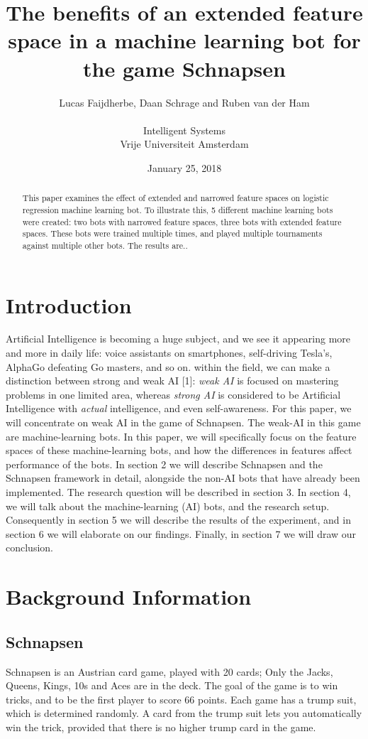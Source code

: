 \documentclass[a4paper,11pt]{article}
\title{The benefits of an extended feature space in a machine learning bot for the game Schnapsen}
\date{January 25, 2018}
\author{Lucas Faijdherbe, Daan Schrage and Ruben van der Ham\\\\
	\small Intelligent Systems\\
	\small Vrije Universiteit Amsterdam}
\begin{document}
\maketitle
\clearpage

\begin{abstract}
This paper examines the effect of extended and narrowed feature spaces on logistic regression machine learning bot. To illustrate this, 5 different machine learning bots were created: two bots with narrowed feature spaces, three bots with extended feature spaces. These bots were trained multiple times, and played multiple tournaments against multiple other bots. The results are.. 
\end{abstract}

\section{Introduction}
Artificial Intelligence is becoming a huge subject, and we see it appearing more and more in daily life: voice assistants on smartphones, self-driving Tesla's, AlphaGo defeating Go masters, and so on. within the field, we can make a distinction between strong and weak AI [1]: \textit{weak AI} is focused on mastering problems in one limited area, whereas \textit{strong AI} is considered to be Artificial Intelligence with \textit{actual} intelligence, and even self-awareness. For this paper, we will concentrate on weak AI in the game of Schnapsen. The weak-AI in this game are machine-learning bots. In this paper, we will specifically focus on the feature spaces of these machine-learning bots, and how the differences in features affect performance of the bots. In section 2 we will describe Schnapsen and the Schnapsen framework in detail, alongside the non-AI bots that have already been implemented. The research question will be described in section 3. In section 4, we will talk about the machine-learning (AI) bots, and the research setup. Consequently in section 5 we will describe the results of the experiment, and in section 6 we will elaborate on our findings. Finally, in section 7 we will draw our conclusion.

\section{Background Information}
\subsection{Schnapsen}
Schnapsen is an Austrian card game, played with 20 cards; Only the Jacks, Queens, Kings, 10s and Aces are in the deck. The goal of the game is to win tricks, and to be the first player to score 66 points. Each game has a trump suit, which is determined randomly. A card from the trump suit lets you automatically win the trick, provided that there is no higher trump card in the game.
\end{document}
